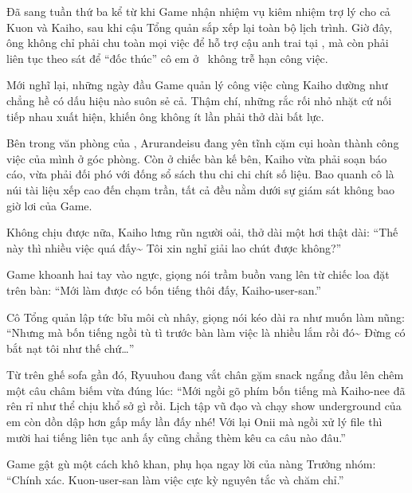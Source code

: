 \documentclass[../main.tex]{subfiles}
\begin{document}

Đã sang tuần thứ ba kể từ khi Game nhận nhiệm vụ kiêm nhiệm trợ lý cho cả Kuon và Kaiho, sau khi cậu Tổng quản sắp xếp lại toàn bộ lịch trình. Giờ đây, ông không chỉ phải chu toàn mọi việc để hỗ trợ cậu anh trai tại \hll, mà còn phải liên tục theo sát để ``đốc thúc'' cô em ở \hls\ không trễ hạn công việc.

Mới nghĩ lại, những ngày đầu Game quản lý công việc cùng Kaiho dường như chẳng hề có dấu hiệu nào suôn sẻ cả. Thậm chí, những rắc rối nhỏ nhặt cứ nối tiếp nhau xuất hiện, khiến ông không ít lần phải thở dài bất lực.

\il

Bên trong văn phòng của \hls, Arurandeisu đang yên tĩnh cặm cụi hoàn thành công việc của mình ở góc phòng. Còn ở chiếc bàn kế bên, Kaiho vừa phải soạn báo cáo, vừa phải đối phó với đống sổ sách thu chi chi chít số liệu. Bao quanh cô là núi tài liệu xếp cao đến chạm trần, tất cả đều nằm dưới sự giám sát không bao giờ lơi của Game.

Không chịu được nữa, Kaiho lưng rũn người oải, thở dài một hơi thật dài: ``Thế này thì nhiều việc quá đấy\~{} Tôi xin nghỉ giải lao chút được không?''

Game khoanh hai tay vào ngực, giọng nói trầm buồn vang lên từ chiếc loa đặt trên bàn: ``Mới làm được có bốn tiếng thôi đấy, Kaiho-user-san.''

Cô Tổng quản lập tức bĩu môi cù nhây, giọng nói kéo dài ra như muốn làm nũng: ``Nhưng mà bốn tiếng ngồi tù tì trước bàn làm việc là nhiều lắm rồi đó\~{} Đừng có bắt nạt tôi như thế chứ\dots''

Từ trên ghế sofa gần đó, Ryuuhou đang vắt chân gặm snack ngẩng đầu lên chêm một câu châm biếm vừa đúng lúc: ``Mới ngồi gõ phím bốn tiếng mà Kaiho-nee đã rên rỉ như thể chịu khổ sở gì rồi. Lịch tập vũ đạo và chạy show underground của em còn dồn dập hơn gấp mấy lần đấy nhé! Với lại Onii mà ngồi xử lý file thì mười hai tiếng liên tục anh ấy cũng chẳng thèm kêu ca câu nào đâu.''

Game gật gù một cách khô khan, phụ họa ngay lời của nàng Trưởng nhóm: ``Chính xác. Kuon-user-san làm việc cực kỳ nguyên tắc và chăm chỉ.''
\end{document}
